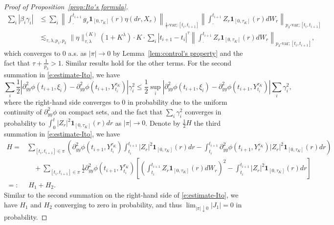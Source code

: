 \documentclass[11pt,reqno]{amsart}
\numberwithin{equation}{section}
\begin{document}
\begin{proof}[Proof of Proposition~\ref{prop:Ito's formula}]
\begin{align*}
\sum_{i}\left|\beta_i \gamma_i\right|		& \le \sum\limits_{i}\left\|\int_{\cdot}^{t_{i+1}}g_{r}\mathbf{1}_{[0,\tau_{K}]}(r)\eta(dr,X_{r})\right\|_{\frac{1}{\tau}\text{-var};[t_{i},t_{i+1}]} \left\|\int_{\cdot}^{t_{i+1}}Z_{r}\mathbf{1}_{[0,\tau_{K}]}(r)dW_{r}\right\|_{p_{3}\text{-var};[t_{i},t_{i+1}]}\\
&\lesssim_{\tau,\lambda,p_{1},p_{2}}\|\eta\|^{(K)}_{\tau,\lambda}(1+K^{\lambda})\cdot K\cdot \sum_{i}|t_{i+1}-t_{i}|^{\tau}\left\|\int_{\cdot}^{t_{i+1}}Z_{r}\mathbf{1}_{[0,\tau_{K}]}(r)dW_{r}\right\|_{p_{3}\text{-var};[t_{i},t_{i+1}]},
\end{align*}
which converges to 0 a.s. as $|\pi|\to 0$ by Lemma~\ref{lem:control's property} and the fact that $\tau + \frac{1}{p_{3}} > 1$. Similar results hold for the other terms. For the second summation in \eqref{e:estimate-Ito}, we have	
\begin{equation*}
\sum_{i}\frac{1}{2}\left|\partial^{2}_{yy}\phi(t_{i+1},\xi_{i}) - \partial^{2}_{yy}\phi(t_{i+1},Y^{\tau_K}_{t_{i}})\right|\gamma_i^{2}\le \frac{1}{2}\sup_{i}\left|\partial^{2}_{yy}\phi(t_{i+1},\xi_{i})-\partial^{2}_{yy}\phi(t_{i+1},Y^{\tau_K}_{t_{i}})\right| \sum_{i}\gamma_i^{2},
\end{equation*}
where the right-hand side converges to 0 in probability due to the uniform continuity of $\partial^2_{yy}\phi$ on compact sets, 
and the fact that $\sum_{i}\gamma_i^{2}$ converges in probability  to $\int_{0}^{t} |Z_{r}|^{2}\mathbf{1}_{[0,\tau_{K}]}(r) dr$ as $|\pi|\to0$.
Denote by $\frac12H$ the third summation in \eqref{e:estimate-Ito}, we have 
\begin{align*}
H =& \sum_{[t_{i},t_{i+1}]\in\pi}\left(\partial^{2}_{yy}\phi(t_{i+1},Y^{\tau_{K}}_{t_{i}}) \int_{t_{i}}^{t_{i+1}}|Z_{r}|^{2}\mathbf{1}_{[0,\tau_{K}]}(r)dr - \int_{t_{i}}^{t_{i+1}}\partial^{2}_{yy}\phi(t_{i+1},Y^{\tau_{K}}_{r})|Z_{r}|^{2}\mathbf{1}_{[0,\tau_{K}]}(r)dr\right)	\\
&\quad + \sum\limits_{[t_{i},t_{i+1}]\in\pi}\frac{1}{2} \partial^{2}_{yy}\phi(t_{i+1},Y^{\tau_{K}}_{t_{i}}) \left[\left(\int_{t_{i}}^{t_{i+1}}Z_{r}\mathbf{1}_{[0,\tau_{K}]}(r)dW_{r}\right)^{2} - \int_{t_{i}}^{t_{i+1}}|Z_{r}|^{2}\mathbf{1}_{[0,\tau_{K}]}(r)dr\right]\\[1mm]
=: & \ H_{1} + H_{2}.
\end{align*}
Similar to the second summation on the right-hand side of \eqref{e:estimate-Ito}, we have $H_1$ and $H_2$ converging to zero in probability, and thus $\lim_{|\pi|\downarrow 0}|J_1| = 0$ in probability.


\end{proof}
\end{document}
